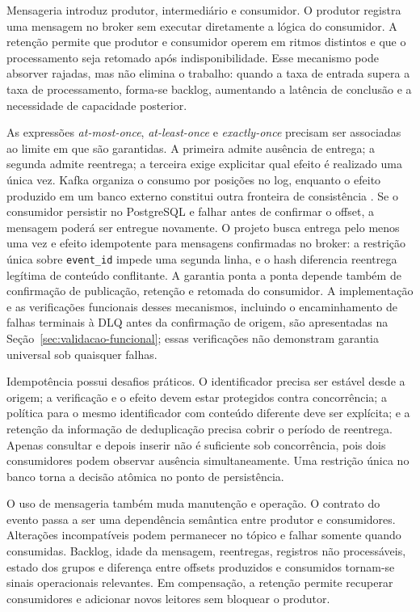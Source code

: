 Mensageria introduz produtor, intermediário e consumidor. O produtor registra uma mensagem no broker sem executar diretamente a lógica do consumidor. A retenção permite que produtor e consumidor operem em ritmos distintos e que o processamento seja retomado após indisponibilidade. Esse mecanismo pode absorver rajadas, mas não elimina o trabalho: quando a taxa de entrada supera a taxa de processamento, forma-se backlog, aumentando a latência de conclusão e a necessidade de capacidade posterior.

As expressões \textit{at-most-once}, \textit{at-least-once} e \textit{exactly-once} precisam ser associadas ao limite em que são garantidas. A primeira admite ausência de entrega; a segunda admite reentrega; a terceira exige explicitar qual efeito é realizado uma única vez. Kafka organiza o consumo por posições no log, enquanto o efeito produzido em um banco externo constitui outra fronteira de consistência \cite{kreps2011,helland2007}. Se o consumidor persistir no PostgreSQL e falhar antes de confirmar o offset, a mensagem poderá ser entregue novamente. O projeto busca entrega pelo menos uma vez e efeito idempotente para mensagens confirmadas no broker: a restrição única sobre \texttt{event\_id} impede uma segunda linha, e o hash diferencia reentrega legítima de conteúdo conflitante. A garantia ponta a ponta depende também de confirmação de publicação, retenção e retomada do consumidor. A implementação e as verificações funcionais desses mecanismos, incluindo o encaminhamento de falhas terminais à DLQ antes da confirmação de origem, são apresentadas na Seção~\ref{sec:validacao-funcional}; essas verificações não demonstram garantia universal sob quaisquer falhas.

Idempotência possui desafios práticos. O identificador precisa ser estável desde a origem; a verificação e o efeito devem estar protegidos contra concorrência; a política para o mesmo identificador com conteúdo diferente deve ser explícita; e a retenção da informação de deduplicação precisa cobrir o período de reentrega. Apenas consultar e depois inserir não é suficiente sob concorrência, pois dois consumidores podem observar ausência simultaneamente. Uma restrição única no banco torna a decisão atômica no ponto de persistência.

O uso de mensageria também muda manutenção e operação. O contrato do evento passa a ser uma dependência semântica entre produtor e consumidores. Alterações incompatíveis podem permanecer no tópico e falhar somente quando consumidas. Backlog, idade da mensagem, reentregas, registros não processáveis, estado dos grupos e diferença entre offsets produzidos e consumidos tornam-se sinais operacionais relevantes. Em compensação, a retenção permite recuperar consumidores e adicionar novos leitores sem bloquear o produtor.

